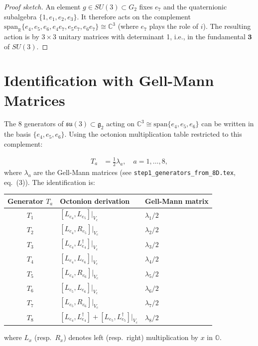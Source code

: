 \documentclass[12pt,a4paper]{article}
\theoremstyle{definition}
\theoremstyle{remark}
\begin{document}
\begin{proof}[Proof sketch]
An element $g\in SU(3) \subset G_2$ fixes $e_7$ and the quaternionic
subalgebra $\{1, e_1, e_2, e_3\}$.  It therefore acts on the complement
$\mathrm{span}_\mathbb{R}\{e_4, e_5, e_6, e_4e_7, e_5e_7, e_6e_7\}
\cong \mathbb{C}^3$ (where $e_7$ plays the role of $i$).
The resulting action is by $3\times 3$ unitary matrices with determinant 1,
i.e., in the fundamental $\mathbf{3}$ of $SU(3)$.
\end{proof}

\section{Identification with Gell-Mann Matrices}
\label{sec:gellmann}

The 8 generators of $\mathfrak{su}(3) \subset \mathfrak{g}_2$ acting on
$\mathbb{C}^3 \cong \mathrm{span}\{e_4, e_5, e_6\}$ can be written
in the basis $\{e_4, e_5, e_6\}$.  Using the octonion multiplication
table restricted to this complement:

\begin{align}
  T_a &= \tfrac{1}{2}\lambda_a, \quad a = 1,\ldots,8,
  \label{eq:generators}
\end{align}
where $\lambda_a$ are the Gell-Mann matrices (see
\texttt{step1\_generators\_from\_8D.tex}, eq.~(3)).  The identification
is:
\begin{center}
\begin{tabular}{cll}
  \toprule
  Generator $T_a$ & Octonion derivation & Gell-Mann matrix \\
  \midrule
  $T_1$ & $[L_{e_4}, L_{e_5}]|_{V_c}$ & $\lambda_1/2$ \\
  $T_2$ & $[L_{e_4}, R_{e_5}]|_{V_c}$ & $\lambda_2/2$ \\
  $T_3$ & $[L_{e_4}, L_{e_4}^\dagger]|_{V_c}$ & $\lambda_3/2$ \\
  $T_4$ & $[L_{e_4}, L_{e_6}]|_{V_c}$ & $\lambda_4/2$ \\
  $T_5$ & $[L_{e_4}, R_{e_6}]|_{V_c}$ & $\lambda_5/2$ \\
  $T_6$ & $[L_{e_5}, L_{e_6}]|_{V_c}$ & $\lambda_6/2$ \\
  $T_7$ & $[L_{e_5}, R_{e_6}]|_{V_c}$ & $\lambda_7/2$ \\
  $T_8$ & $[L_{e_4}, L_{e_4}^\dagger] + [L_{e_5}, L_{e_5}^\dagger]|_{V_c}$ & $\lambda_8/2$ \\
  \bottomrule
\end{tabular}
\end{center}
where $L_x$ (resp.\ $R_x$) denotes left (resp.\ right) multiplication by $x$
in $\mathbb{O}$.
\end{document}
